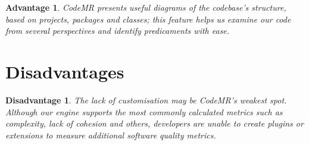\documentclass[11pt]{article}
\newtheorem{remark}{Disadvantage}
\newtheorem{prof}{Advantage}
\begin{document}
\begin{prof}
CodeMR presents useful diagrams of the codebase's structure, based on projects, packages and classes; this feature helps us examine our code from several perspectives and identify predicaments with ease.
\end{prof}

\section{Disadvantages}

\begin{remark}
The lack of customisation may be CodeMR's weakest spot. Although our engine supports the most commonly calculated metrics such as complexity, lack of cohesion and others, developers are unable to create plugins or extensions to measure additional software quality metrics.
\end{remark} 
\end{document}
